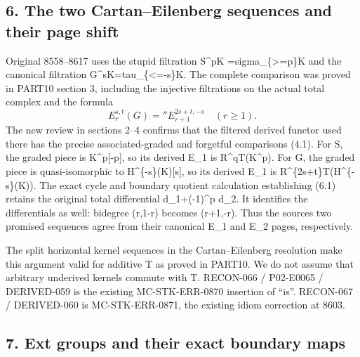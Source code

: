 \documentclass[11pt]{article}
\begin{document}
\subsection{\texorpdfstring{6. The two Cartan–\allowbreak{}Eilenberg sequences and their page shift}{6. The two  sequences and their page shift}}\label{proofs-8352-8772-the-two-cartaneilenberg-sequences-and-their-page-shift}

Original 8558–\allowbreak{}8617 uses the stupid filtration S\^{}pK \allowbreak{}=sigma\_\allowbreak{}\{>\allowbreak{}=p\}K and the canonical filtration G\textasciicircum{}sK\allowbreak{}=tau\_\allowbreak{}\{<\allowbreak{}=-s\}K. The complete comparison was proved in PART10 section 3,\allowbreak{} including the injective filtrations on the actual total complex and the formula \[
 E_r^{s,t}(G)=
 {}''E_{r+1}^{2s+t,-s}\quad(r\ge1).                          \tag{6.1}
\] The new review in sections 2–\allowbreak{}4 confirms that the filtered derived functor used there has the precise associated-graded and forgetful comparisons (4.1)\allowbreak{}. For S,\allowbreak{} the graded piece is K\textasciicircum{}p[-p]\allowbreak{},\allowbreak{} so its derived E\_\allowbreak{}1 is R\textasciicircum{}qT(K\textasciicircum{}p)\allowbreak{}. For G,\allowbreak{} the graded piece is quasi-isomorphic to H\textasciicircum{}\{-s\}(K)\allowbreak{}[s]\allowbreak{},\allowbreak{} so its derived E\_\allowbreak{}1 is R\textasciicircum{}\{2s\allowbreak{}+t\}T(H\textasciicircum{}\{-s\}(K)\allowbreak{})\allowbreak{}. The exact cycle and boundary quotient calculation establishing (6.1)\allowbreak{} retains the original total differential d\_\allowbreak{}1\allowbreak{}+(-1)\allowbreak{}\textasciicircum{}p d\_\allowbreak{}2. It identifies the differentials as well:\allowbreak{} bidegree (r,\allowbreak{}1-r)\allowbreak{} becomes (r\allowbreak{}+1,\allowbreak{}-r)\allowbreak{}. Thus the source\textquotesingle s two promised sequences agree from their canonical E\_\allowbreak{}1 and E\_\allowbreak{}2 pages,\allowbreak{} respectively.

The split horizontal kernel sequences in the Cartan–\allowbreak{}Eilenberg resolution make this argument valid for additive T as proved in PART10. We do not assume that arbitrary underived kernels commute with T. RECON-066 /\allowbreak{} P02-E0065 /\allowbreak{} DERIVED-059 is the existing MC-STK-ERR-0870 insertion of ``is''. RECON-067 /\allowbreak{} DERIVED-060 is MC-STK-ERR-0871,\allowbreak{} the existing idiom correction at 8603.

\subsection{7. Ext groups and their exact boundary maps}\label{proofs-8352-8772-ext-groups-and-their-exact-boundary-maps}
\end{document}
